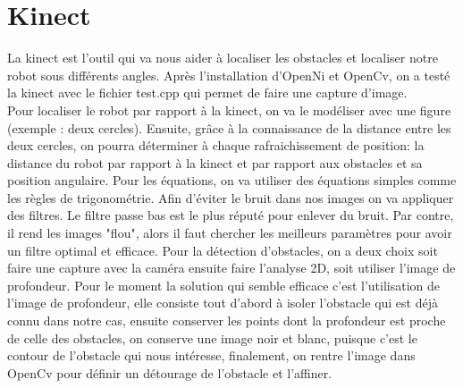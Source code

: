\section{Kinect}
La kinect est l’outil qui va nous aider à localiser les obstacles et localiser notre robot sous différents angles. Après l’installation d’OpenNi et OpenCv, on a testé la kinect avec le fichier test.cpp qui permet de faire une capture d’image.\\
Pour localiser le robot par rapport à la kinect, on va le modéliser avec une figure (exemple : deux cercles). Ensuite, grâce à la connaissance de la distance entre les deux cercles, on pourra déterminer à chaque rafraichissement de position: la distance du robot par rapport à la kinect et par rapport aux obstacles et sa position angulaire. Pour  les équations, on va utiliser des équations simples comme les règles de trigonométrie. Afin d'éviter le bruit dans nos images on va appliquer des filtres. Le filtre passe bas est le plus réputé  pour enlever du bruit. Par contre, il rend les images "flou", alors il faut chercher les meilleurs paramètres pour avoir un filtre optimal et efficace.  Pour la détection d’obstacles, on a deux choix soit faire une capture avec la caméra ensuite faire l’analyse 2D, soit utiliser l’image de profondeur. Pour le moment la solution qui semble efficace c’est l’utilisation de l’image de profondeur, elle consiste tout d'abord à isoler l'obstacle qui est déjà connu dans notre cas, ensuite conserver les points dont la profondeur est proche de celle des obstacles, on conserve une image noir et blanc, puisque c'est le contour de l'obstacle qui nous intéresse, finalement, on rentre l'image dans OpenCv pour définir un détourage de l'obstacle et l'affiner. 
